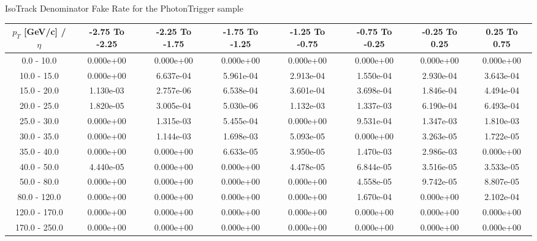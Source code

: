 \large 
IsoTrack Denominator Fake Rate for the PhotonTrigger sample
\footnotesize 
\begin{tabular*}{\textwidth}{|c|c|c|c|c|c|c|c|}\hline 
$p_T$ [GeV/c] / $\eta$  & -2.75 To -2.25 & -2.25 To -1.75 & -1.75 To -1.25 & -1.25 To -0.75 & -0.75 To -0.25 & -0.25 To 0.25 & 0.25 To 0.75 \\ 
 \hline 
0.0 - 10.0 & 0.000e+00 & 0.000e+00 & 0.000e+00 & 0.000e+00 & 0.000e+00 & 0.000e+00 & 0.000e+00 \\ 
10.0 - 15.0 & 0.000e+00 & 6.637e-04 & 5.961e-04 & 2.913e-04 & 1.550e-04 & 2.930e-04 & 3.643e-04 \\ 
15.0 - 20.0 & 1.130e-03 & 2.757e-06 & 6.538e-04 & 3.601e-04 & 3.698e-04 & 1.846e-04 & 4.494e-04 \\ 
20.0 - 25.0 & 1.820e-05 & 3.005e-04 & 5.030e-06 & 1.132e-03 & 1.337e-03 & 6.190e-04 & 6.493e-04 \\ 
25.0 - 30.0 & 0.000e+00 & 1.315e-03 & 5.455e-04 & 0.000e+00 & 9.531e-04 & 1.347e-03 & 1.810e-03 \\ 
30.0 - 35.0 & 0.000e+00 & 1.144e-03 & 1.698e-03 & 5.093e-05 & 0.000e+00 & 3.263e-05 & 1.722e-05 \\ 
35.0 - 40.0 & 0.000e+00 & 0.000e+00 & 6.633e-05 & 3.950e-05 & 1.470e-03 & 2.986e-03 & 0.000e+00 \\ 
40.0 - 50.0 & 4.440e-05 & 0.000e+00 & 0.000e+00 & 4.478e-05 & 6.844e-05 & 3.516e-05 & 3.533e-05 \\ 
50.0 - 80.0 & 0.000e+00 & 0.000e+00 & 0.000e+00 & 0.000e+00 & 4.558e-05 & 9.742e-05 & 8.807e-05 \\ 
80.0 - 120.0 & 0.000e+00 & 0.000e+00 & 0.000e+00 & 0.000e+00 & 1.670e-04 & 0.000e+00 & 2.102e-04 \\ 
120.0 - 170.0 & 0.000e+00 & 0.000e+00 & 0.000e+00 & 0.000e+00 & 0.000e+00 & 0.000e+00 & 0.000e+00 \\ 
170.0 - 250.0 & 0.000e+00 & 0.000e+00 & 0.000e+00 & 0.000e+00 & 0.000e+00 & 0.000e+00 & 0.000e+00 \\ 
 \hline 
\end{tabular*} 
